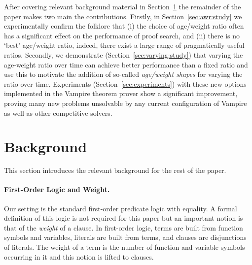 \documentclass{llncs}
\begin{document}
After covering relevant background material in Section~\ref{sec:background} the remainder of the paper makes two main the contributions.
Firstly, in Section~\ref{sec:awr:study} we experimentally confirm the folklore that (i) the choice of age/weight ratio often has a significant effect on the performance of proof search, and (ii) there is no `best' age/weight ratio, indeed, there exist a large range of pragmatically useful ratios.
Secondly, we demonstrate (Section~\ref{sec:varying:study}) that varying the age-weight ratio over time can achieve better performance than a fixed ratio and use this to motivate the addition of so-called \emph{age/weight shapes} for varying the ratio over time. 
Experiments (Section~\ref{sec:experiments}) with these new options implemented in the Vampire theorem prover show a significant improvement, proving many new problems unsolvable by any current configuration of Vampire as well as other competitive solvers.

\section{Background} \label{sec:background}

This section introduces the relevant background for the rest of the paper.



\paragraph{First-Order Logic and Weight.} Our setting is the standard first-order predicate logic with equality. A formal definition of this logic is not required for this paper but an important notion is that of the \emph{weight} of a clause. In first-order logic,  terms are built from function symbols and variables, literals are built from terms, and clauses are disjunctions of literals. The weight of a term is the number of function and variable symbols occurring in it and this notion is lifted to clauses. 
\end{document}
